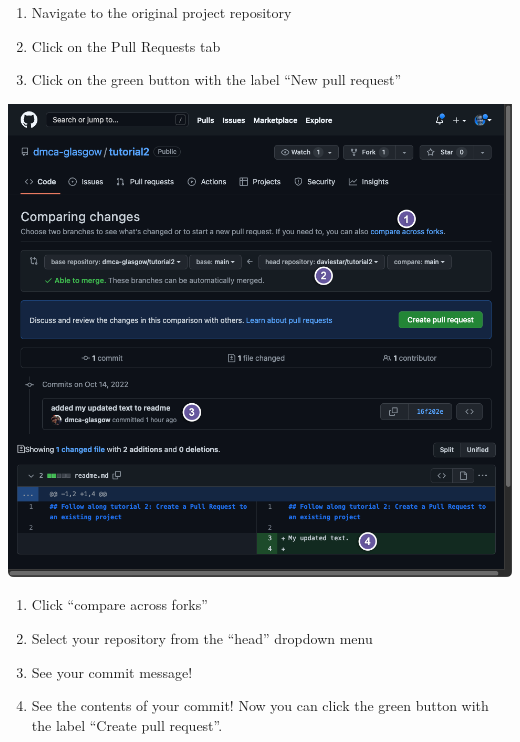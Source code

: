 \documentclass[
  letterpaper,
  DIV=11,
  numbers=noendperiod]{scrartcl}
\providecommand{\tightlist}{%
  \setlength{\itemsep}{0pt}\setlength{\parskip}{0pt}}\usepackage{longtable,booktabs,array}
\begin{document}
\begin{enumerate}
\def\labelenumi{\arabic{enumi}.}
\tightlist
\item
  Navigate to the original project repository
\item
  Click on the Pull Requests tab
\item
  Click on the green button with the label ``New pull request''
\end{enumerate}

\includegraphics{images/image84.png}

\begin{enumerate}
\def\labelenumi{\arabic{enumi}.}
\tightlist
\item
  Click ``compare across forks''
\item
  Select your repository from the ``head'' dropdown menu
\item
  See your commit message!
\item
  See the contents of your commit! Now you can click the green button
  with the label ``Create pull request''.
\end{enumerate}
\end{document}
